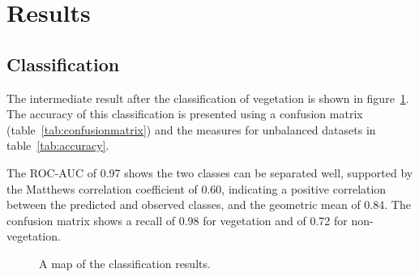 \section{Results}
\subsection{Classification}
The intermediate result after the classification of vegetation is shown in figure~\ref{fig:classification2D}. The accuracy of this classification is presented using a confusion matrix (table~\ref{tab:confusionmatrix}) and the measures for unbalanced datasets in table~\ref{tab:accuracy}.

The ROC-AUC of 0.97 shows the two classes can be separated well, supported by the Matthews correlation coefficient of 0.60, indicating a positive correlation between the predicted and observed classes, and the geometric mean of 0.84. The confusion matrix shows a recall of 0.98 for vegetation and of 0.72 for non-vegetation.

\begin{figure}[!b]
	\centering
	\caption{A map of the classification results.}
	\label{fig:classification2D}
\end{figure}

